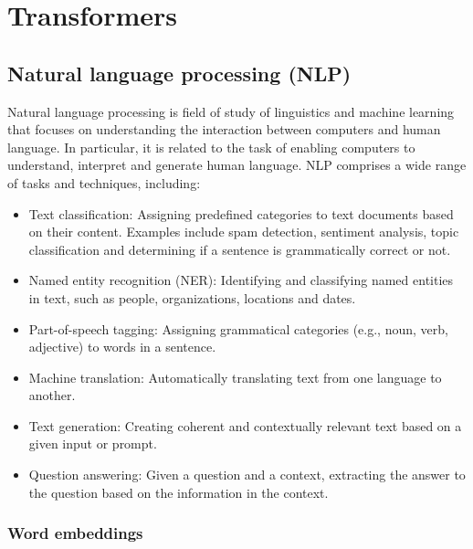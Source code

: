 \section{Transformers}\label{sec:transformers}

\subsection{Natural language processing (NLP)}\label{subsec:nlp_word_embeddings}

Natural language processing is field of study of linguistics and machine learning that focuses on understanding the interaction between computers and human language. In particular, it is related to the task of enabling computers to understand, interpret and generate human language. NLP comprises a wide range of tasks and techniques, including: 

\begin{itemize}
    \item Text classification: Assigning predefined categories to text documents based on their content. Examples include spam detection, sentiment analysis, topic classification and determining if a sentence is grammatically correct or not.  
    \item Named entity recognition (NER): Identifying and classifying named entities in text, such as people, organizations, locations and dates.
    \item Part-of-speech tagging: Assigning grammatical categories (e.g., noun, verb, adjective) to words in a sentence.
    \item Machine translation: Automatically translating text from one language to another.
    \item Text generation: Creating coherent and contextually relevant text based on a given input or prompt.
    \item Question answering: Given a question and a context, extracting the answer to the question based on the information in the context.
\end{itemize}

\subsubsection{Word embeddings}\label{subsubsec:word_embeddings}

